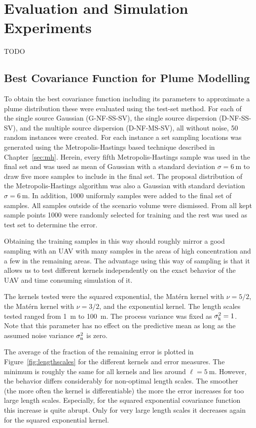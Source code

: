 \chapter{Evaluation and Simulation Experiments}\label{sec:exp}
TODO

\section{Best Covariance Function for Plume Modelling}\label{sec:bestkernel}
To obtain the best covariance function including its parameters to approximate 
a plume distribution these were evaluated using the test-set method. For each of 
the single source Gaussian (G-NF-SS-SV), the single source dispersion 
(D-NF-SS-SV), and the multiple source dispersion (D-NF-MS-SV), all without 
noise, 50 random instances were created. For each instance a set sampling 
locations was generated using the Metropolis-Hastings based technique described 
in Chapter~\ref{sec:mh}. Herein, every fifth Metropolis-Hastings sample was used 
in the final set and was used as mean of Gaussian with a standard deviation 
$\sigma = \SI{6}{\meter}$ to draw five more samples to include in the final set.  
The proposal distribution of the Metropolis-Hastings algorithm was also 
a Gaussian with standard deviation $\sigma = \SI{6}{\meter}$. In addition, 1000 
uniformly samples were added to the final set of samples. All samples outside of 
the scenario volume were dismissed. From all kept sample points 1000 were 
randomly selected for training and the rest was used as test set to determine 
the error.

Obtaining the training samples in this way should roughly mirror a good sampling 
with an UAV with many samples in the areas of high concentration and a few in 
the remaining areas. The advantage using this way of sampling is that it allows 
us to test different kernels independently on the exact behavior of the UAV and 
time consuming simulation of it.

The kernels tested were the squared exponential, the Mat\'ern kernel with $\nu 
= 5/2$, the Mat\'ern kernel with $\nu = 3/2$, and the exponential kernel. The 
length scales tested ranged from \SI{1}{\meter} to \SI{100}{\meter}. The process 
variance was fixed as $\sigma_{\mathrm{k}}^2 = 1$. Note that this parameter has no 
effect on the predictive mean as long as the assumed noise variance 
$\sigma_{\mathrm{n}}^2$ is zero.

The average of the fraction of the remaining error is plotted in 
Figure~\ref{fig:lengthscales} for the different kernels and error measures. The 
minimum is roughly the same for all kernels and lies around $\ell 
= \SI{5}{\meter}$.  However, the behavior differs considerably for non-optimal 
length scales.  The smoother (the more often the kernel is differentiable) the 
more the error increases for too large length scales.  Especially, for the 
squared exponential covariance function this increase is quite abrupt. Only for 
very large length scales it decreases again for the squared exponential kernel.

